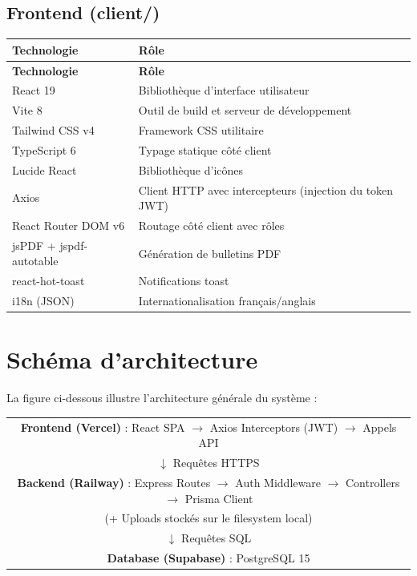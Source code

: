 \documentclass[12pt,a4paper]{report}
\begin{document}
\subsection*{Frontend (client/)}
\begin{longtable}{|p{4.5cm}|p{10cm}|}
\hline
\textbf{Technologie} & \textbf{Rôle} \\
\hline
\endfirsthead
\hline
\textbf{Technologie} & \textbf{Rôle} \\
\hline
\endhead
React 19 & Bibliothèque d'interface utilisateur \\
\hline
Vite 8 & Outil de build et serveur de développement \\
\hline
Tailwind CSS v4 & Framework CSS utilitaire \\
\hline
TypeScript 6 & Typage statique côté client \\
\hline
Lucide React & Bibliothèque d'icônes \\
\hline
Axios & Client HTTP avec intercepteurs (injection du token JWT) \\
\hline
React Router DOM v6 & Routage côté client avec rôles \\
\hline
jsPDF + jspdf-autotable & Génération de bulletins PDF \\
\hline
react-hot-toast & Notifications toast \\
\hline
i18n (JSON) & Internationalisation français/anglais \\
\hline
\end{longtable}
 
\section{Schéma d'architecture}
La figure ci-dessous illustre l'architecture générale du système :

\begin{center}
\begin{tabular}{c}
\textbf{Frontend (Vercel)} : React SPA $\rightarrow$ Axios Interceptors (JWT) $\rightarrow$ Appels API \\
$\downarrow$ Requêtes HTTPS \\
\textbf{Backend (Railway)} : Express Routes $\rightarrow$ Auth Middleware $\rightarrow$ Controllers $\rightarrow$ Prisma Client \\
(+ Uploads stockés sur le filesystem local) \\
$\downarrow$ Requêtes SQL \\
\textbf{Database (Supabase)} : PostgreSQL 15 \\
\end{tabular}
\end{center}
 
\end{document}
